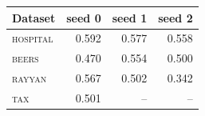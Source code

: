 \begin{tabular}{lrrr}
\toprule
Dataset & seed 0 & seed 1 & seed 2 \\
\midrule
\textsc{hospital} & 0.592 & 0.577 & 0.558 \\
\textsc{beers} & 0.470 & 0.554 & 0.500 \\
\textsc{rayyan} & 0.567 & 0.502 & 0.342 \\
\textsc{tax} & 0.501 & -- & -- \\
\bottomrule
\end{tabular}

